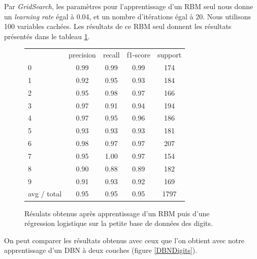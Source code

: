 \documentclass[10pt,a4paper]{article}
\begin{document}
Par \textit{GridSearch}, les paramètres pour l'apprentissage d'un RBM seul nous donne un \emph{learning rate} égal à 0.04, et un nombre d'itérations égal à 20. Nous utilisons 100 variables cachées. Les résultats de ce RBM seul donnent les résultats présentés dans le tableau \ref{RBMDigits}.
\begin{figure}[ht!]\centering
	\begin{tabular}{l|c|c|c|c}
						 &  precision  &  recall & f1-score  & support \\
						0&       0.99   &   0.99    &  0.99   &    174 \\
						1 &      0.92    &  0.95     & 0.93     &  184 \\
						2  &     0.95    &  0.98      &0.97    &   166 \\
						3   &    0.97    &  0.91     & 0.94   &    194 \\
						4    &   0.97    &  0.95    &  0.96  &     186 \\
						5     &  0.93  &    0.93     & 0.93 &      181 \\
						6      & 0.98    &  0.97    &  0.97&       207 \\
						7       &0.95  &    1.00    &  0.97   &    154 \\
						8       &0.90   &   0.88     & 0.89   &    182 \\
						9 &      0.91    &  0.93    &  0.92     &  169 \\
	avg / total  &     0.95    &  0.95    &  0.95    &  1797 \\
	\end{tabular}
	\label{RBMDigits}
	\caption{Résulats obtenus après apprentissage d'un RBM puis d'une régression logistique sur la petite base de données des digits.}
\end{figure}


On peut comparer les résultats obtenus avec ceux que l'on obtient avec notre apprentissage d'un DBN à deux couches (figure \ref{DBNDigits}).
\end{document}
